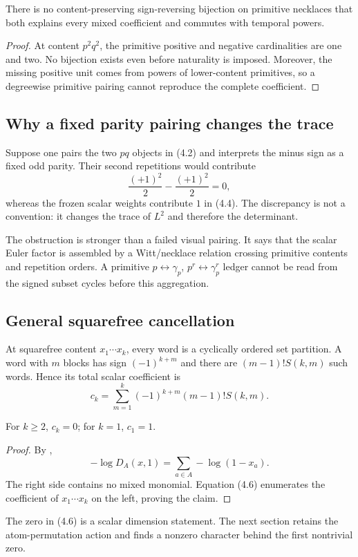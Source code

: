 \begin{corollary}
\label{cor:no-primitive-involution}
There is no content-preserving sign-reversing bijection on primitive
necklaces that both explains every mixed coefficient and commutes with
temporal powers.
\end{corollary}

\begin{proof}
At content $p^2q^2$, the primitive positive and negative cardinalities are one
and two.  No bijection exists even before naturality is imposed.  Moreover,
the missing positive unit comes from powers of lower-content primitives, so a
degreewise primitive pairing cannot reproduce the complete coefficient.
\end{proof}

\subsection{Why a fixed parity pairing changes the trace}

Suppose one pairs the two $pq$ objects in (4.2) and interprets the minus sign
as a fixed odd parity.  Their second repetitions would contribute
\[
  \frac{(+1)^2}{2}-\frac{(+1)^2}{2}=0,
  \tag{4.5}
\]
whereas the frozen scalar weights contribute $1$ in (4.4).  The discrepancy
is not a convention: it changes the trace of $L^2$ and therefore the
determinant.

The obstruction is stronger than a failed visual pairing.  It says that the
scalar Euler factor is assembled by a Witt/necklace relation crossing
primitive contents and repetition orders.  A primitive $p\leftrightarrow
\gamma_p$, $p^r\leftrightarrow\gamma_p^r$ ledger cannot be read from the
signed subset cycles before this aggregation.

\subsection{General squarefree cancellation}

At squarefree content $x_1\cdots x_k$, every word is a cyclically ordered set
partition.  A word with $m$ blocks has sign $(-1)^{k+m}$ and there are
$(m-1)!S(k,m)$ such words.  Hence its total scalar coefficient is
\[
  c_k=\sum_{m=1}^k(-1)^{k+m}(m-1)!S(k,m).
  \tag{4.6}
\]

\begin{proposition}
\label{prop:stirling}
For $k\ge2$, $c_k=0$; for $k=1$, $c_1=1$.
\end{proposition}

\begin{proof}
By ,
\[
  -\log D_A(x,1)=\sum_{a\in A}-\log(1-x_a).
  \tag{4.7}
\]
The right side contains no mixed monomial.  Equation (4.6) enumerates the
coefficient of $x_1\cdots x_k$ on the left, proving the claim.
\end{proof}

The zero in (4.6) is a scalar dimension statement.  The next section retains
the atom-permutation action and finds a nonzero character behind the first
nontrivial zero.
